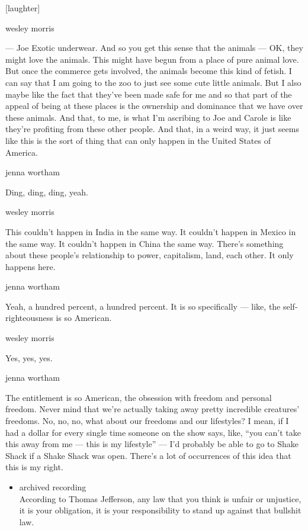 {[}laughter{]}

wesley morris

--- Joe Exotic underwear. And so you get this sense that the animals ---
OK, they might love the animals. This might have begun from a place of
pure animal love. But once the commerce gets involved, the animals
become this kind of fetish. I can say that I am going to the zoo to just
see some cute little animals. But I also maybe like the fact that
they've been made safe for me and so that part of the appeal of being at
these places is the ownership and dominance that we have over these
animals. And that, to me, is what I'm ascribing to Joe and Carole is
like they're profiting from these other people. And that, in a weird
way, it just seems like this is the sort of thing that can only happen
in the United States of America.

jenna wortham

Ding, ding, ding, yeah.

wesley morris

This couldn't happen in India in the same way. It couldn't happen in
Mexico in the same way. It couldn't happen in China the same way.
There's something about these people's relationship to power,
capitalism, land, each other. It only happens here.

jenna wortham

Yeah, a hundred percent, a hundred percent. It is so specifically ---
like, the self-righteousness is so American.

wesley morris

Yes, yes, yes.

jenna wortham

The entitlement is so American, the obsession with freedom and personal
freedom. Never mind that we're actually taking away pretty incredible
creatures' freedoms. No, no, no, what about our freedoms and our
lifestyles? I mean, if I had a dollar for every single time someone on
the show says, like, ``you can't take this away from me --- this is my
lifestyle'' --- I'd probably be able to go to Shake Shack if a Shake
Shack was open. There's a lot of occurrences of this idea that this is
my right.

\begin{itemize}
\tightlist
\item
  archived recording\\
  According to Thomas Jefferson, any law that you think is unfair or
  unjustice, it is your obligation, it is your responsibility to stand
  up against that bullshit law.
\end{itemize}

